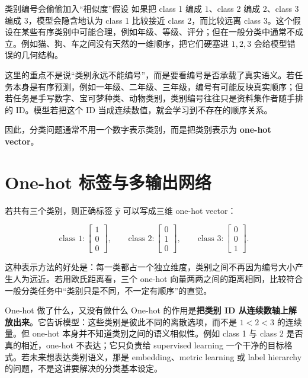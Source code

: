 \documentclass[a4paper]{article}
\begin{document}
\begin{warningbox}{类别编号会偷偷加入``相似度''假设}
    如果把 class 1 编成 $1$、class 2 编成 $2$、class 3 编成 $3$，模型会隐含地认为 class 1 比较接近 class 2，而比较远离 class 3。这个假设在某些有序类别中可能合理，例如年级、等级、评分；但在一般分类中通常不成立。例如猫、狗、车之间没有天然的一维顺序，把它们硬塞进 $1,2,3$ 会给模型错误的几何结构。
\end{warningbox}

这里的重点不是说``类别永远不能编号''，而是要看编号是否承载了真实语义。若任务本身是有序预测，例如一年级、二年级、三年级，编号有可能反映真实顺序；但若任务是手写数字、宝可梦种类、动物类别，类别编号往往只是资料集作者随手排的 ID。模型若把这个 ID 当成连续数值，就会学习到不存在的顺序关系。

因此，分类问题通常不用一个数字表示类别，而是把类别表示为 \textbf{one-hot vector}。

\section{One-hot 标签与多输出网络}

若共有三个类别，则正确标签 $\hat{\boldsymbol{y}}$ 可以写成三维 one-hot vector：

\[
    \text{class 1}: \begin{bmatrix}1\\0\\0\end{bmatrix},\qquad
    \text{class 2}: \begin{bmatrix}0\\1\\0\end{bmatrix},\qquad
    \text{class 3}: \begin{bmatrix}0\\0\\1\end{bmatrix}.
\]

这种表示方法的好处是：每一类都占一个独立维度，类别之间不再因为编号大小产生人为远近。若用欧氏距离看，三个 one-hot 向量两两之间的距离相同，比较符合一般分类任务中``类别只是不同，不一定有顺序''的直觉。

\begin{knowledgebox}{One-hot 做了什么，又没有做什么}
    One-hot 的作用是\textbf{把类别 ID 从连续数轴上解放出来}。它告诉模型：这些类别是彼此不同的离散选项，而不是 $1<2<3$ 的连续量。但 one-hot 本身并不知道类别之间的语义相似性。例如 class 1 与 class 2 是否真的相近，one-hot 不表达；它只负责给 supervised learning 一个干净的目标格式。若未来想表达类别语义，那是 embedding、metric learning 或 label hierarchy 的问题，不是这讲要解决的分类基本设定。
\end{knowledgebox}
\end{document}
